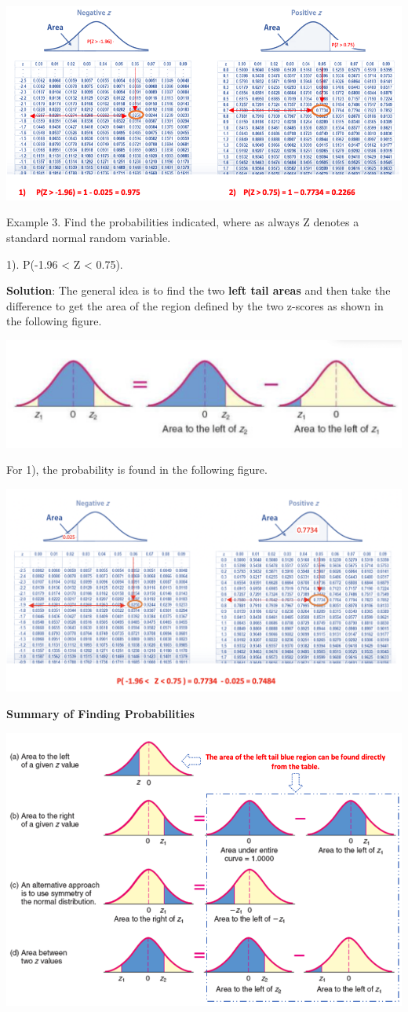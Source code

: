 \documentclass[
]{book}
\begin{document}
\begin{center}\includegraphics[width=0.6\linewidth]{week04/example02} \end{center}

Example 3. Find the probabilities indicated, where as always Z denotes a standard normal random variable.

1). P(-1.96 \textless{} Z \textless{} 0.75).

\textbf{Solution}: The general idea is to find the two \textbf{left tail areas} and then take the difference to get the area of the region defined by the two z-scores as shown in the following figure.

\begin{center}\includegraphics[width=0.6\linewidth]{week04/betweenArea} \end{center}

For 1), the probability is found in the following figure.

\begin{center}\includegraphics[width=0.6\linewidth]{week04/example03} \end{center}

\textbf{Summary of Finding Probabilities}

\hfill\break

\begin{center}\includegraphics[width=0.6\linewidth]{week04/summaryFindingProb} \end{center}
\end{document}
